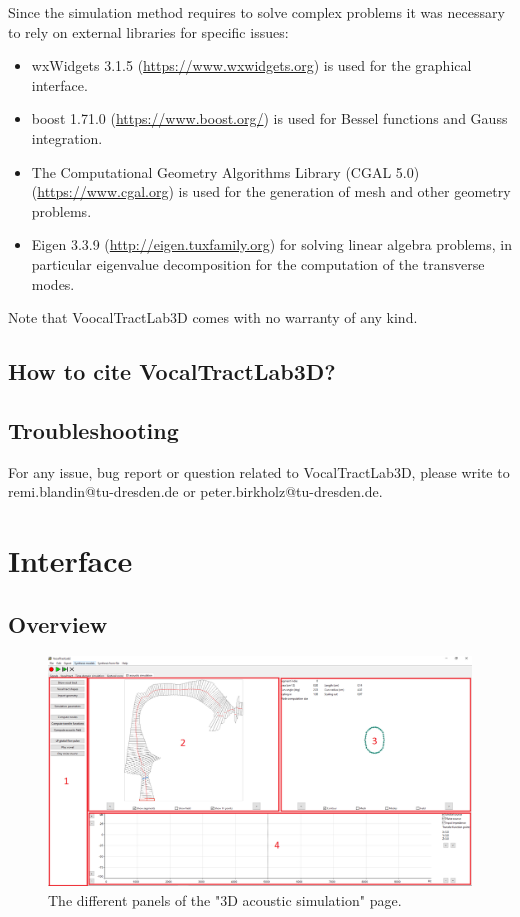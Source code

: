 \documentclass[]{article}
\begin{document}
	Since the simulation method requires to solve complex problems it was necessary to 
	rely on external libraries for specific issues:
	\begin{itemize}
		\item wxWidgets 3.1.5 (\url{https://www.wxwidgets.org}) 
		is used for the graphical interface.
		\item boost 1.71.0 (\url{https://www.boost.org/}) is used for Bessel functions
		and Gauss integration.
		\item The Computational Geometry Algorithms Library (CGAL 5.0) 
		(\url{https://www.cgal.org})
		is used for the generation of mesh and other geometry problems.
		\item Eigen 3.3.9 (\url{http://eigen.tuxfamily.org}) for solving linear algebra problems, in particular
		eigenvalue decomposition for the computation of the transverse modes.
	\end{itemize}

	Note that VoocalTractLab3D comes with no warranty of any kind.
	
	\subsection{How to cite VocalTractLab3D?}
	
	
	\subsection{Troubleshooting}
	
	For any issue, bug report or question related to VocalTractLab3D, please write to
	remi.blandin@tu-dresden.de or peter.birkholz@tu-dresden.de.
	
	\section{Interface}
	
	\subsection{Overview}
	
	\begin{figure}[h!]
		\centering
		\includegraphics[scale=0.35]{acoustic_3d_simu_page.png}
		\caption{The different panels of the "3D acoustic simulation" page.}
		\label{figure:acoustic_3d_simu_page}
	\end{figure}
	
\end{document}
